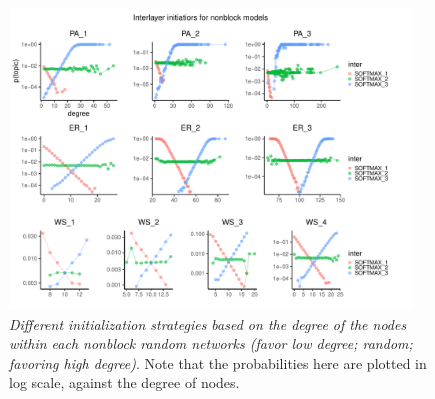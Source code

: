 \begin{figure}[H]
    \centering
    \includegraphics[width=0.95\textwidth,center]{../figures/report/FigS1.pdf}
    \caption{\label{supp:1}
    \textit{Different initialization strategies based on the degree of the nodes within each nonblock random networks (favor low degree; random; favoring high degree)}. Note that the probabilities here are plotted in log scale, against the degree of nodes.
    }
\end{figure}